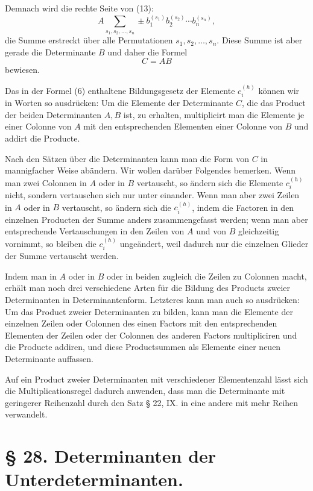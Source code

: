 \documentclass[11pt]{article}
\begin{document}
Demnach wird die rechte Seite von (13):
\[
 A\sum_{s_1,s_2,\ldots,s_n}\pm b_1^{(s_1)}b_2^{(s_2)}\cdots b_n^{(s_n)},
\]
die Summe erstreckt über alle Permutationen $s_1,s_2,\ldots,s_n$. Diese Summe ist aber gerade die Determinante $B$ und daher die Formel
\[
 C=AB
\]
bewiesen.

Das in der Formel (6) enthaltene Bildungsgesetz der Elemente $c_i^{(h)}$ können wir in Worten so ausdrücken: Um die Elemente der Determinante $C$, die das Product der beiden Determinanten $A,B$ ist, zu erhalten, multiplicirt man die Elemente je einer Colonne von $A$ mit den entsprechenden Elementen einer Colonne von $B$ und addirt die Producte.

Nach den Sätzen über die Determinanten kann man die Form von $C$ in mannigfacher Weise abändern. Wir wollen darüber Folgendes bemerken. Wenn man zwei Colonnen in $A$ oder in $B$ vertauscht, so ändern sich die Elemente $c_i^{(h)}$ nicht, sondern vertauschen sich nur unter einander. Wenn man aber zwei Zeilen in $A$ oder in $B$ vertauscht, so ändern sich die $c_i^{(h)}$, indem die Factoren in den einzelnen Producten der Summe anders zusammengefasst werden; wenn man aber entsprechende Vertauschungen in den Zeilen von $A$ und von $B$ gleichzeitig vornimmt, so bleiben die $c_i^{(h)}$ ungeändert, weil dadurch nur die einzelnen Glieder der Summe vertauscht werden.

Indem man in $A$ oder in $B$ oder in beiden zugleich die Zeilen zu Colonnen macht, erhält man noch drei verschiedene Arten für die Bildung des Products zweier Determinanten in Determinantenform. Letzteres kann man auch so ausdrücken: Um das Product zweier Determinanten zu bilden, kann man die Elemente der einzelnen Zeilen oder Colonnen des einen Factors mit den entsprechenden Elementen der Zeilen oder der Colonnen des anderen Factors multipliciren und die Producte addiren, und diese Productsummen als Elemente einer neuen Determinante auffassen.

Auf ein Product zweier Determinanten mit verschiedener Elementenzahl lässt sich die Multiplicationsregel dadurch anwenden, dass man die Determinante mit geringerer Reihenzahl durch den Satz § 22, IX. in eine andere mit mehr Reihen verwandelt.

\section*{§ 28. Determinanten der Unterdeterminanten.}
\end{document}
